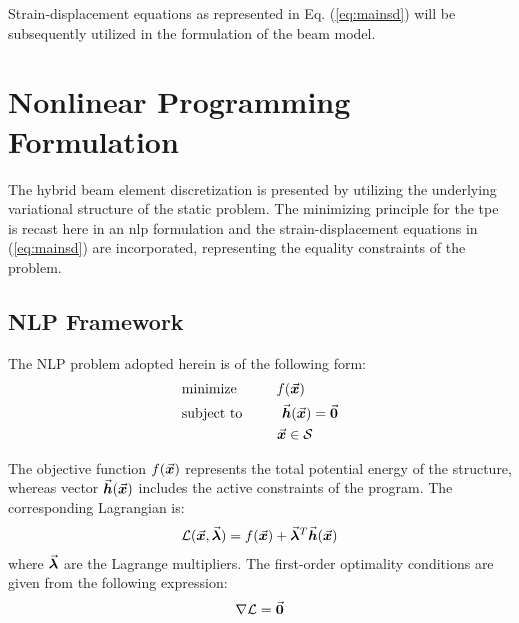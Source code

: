\noindent Strain-displacement equations as represented in Eq. (\ref{eq:mainsd})
will be subsequently utilized in the formulation of the beam model.

\section{Nonlinear Programming Formulation}\label{section:CH2-S3}

The hybrid beam element discretization is presented by utilizing the underlying
variational structure of the static problem. The minimizing principle for the
\acrshort{tpe} is recast here in an \acrshort{nlp}
formulation and the strain-displacement equations in (\ref{eq:mainsd}) are
incorporated, representing the equality constraints of the problem.

\subsection{NLP Framework}\label{subsection:CH2-S3SS1}

The NLP problem adopted herein is of the following form:
\begin{align}
	&\text{minimize} \hspace{1cm}f(\bvec{x})\nonumber\\
	&\text{subject to}\hspace{1.cm}  \bvec{h}(\bvec{x})=\bvec{0}\label{eq:nlp}\\
	&\hspace{2.4cm} \bvec{x}\in\mathcal{S}\nonumber
\end{align}

\noindent The objective function $f(\vec{\bm{x}})$ represents the total potential
energy of the structure, whereas vector $\vec{\bm{h}}(\vec{\bm{x}})$ includes the active
constraints of the program. The corresponding Lagrangian is:
\begin{gather}
	\mathcal{L}(\vec{\bm{x}},\vec{\bm{\lambda}}) = f(\vec{\bm{x}}) + 
	\vec{\bm{\lambda}}^T\vec{\bm{h}}(\vec{\bm{x}})
	\label{eq:lagr}
\end{gather}
\noindent where $\vec{\bm{\lambda}}$ are the Lagrange multipliers. The first-order
optimality conditions are given from the following expression:
\begin{gather}
	\nabla\mathcal{L}=\vec{\bm{0}}
	\label{eq:gradz}
\end{gather}

